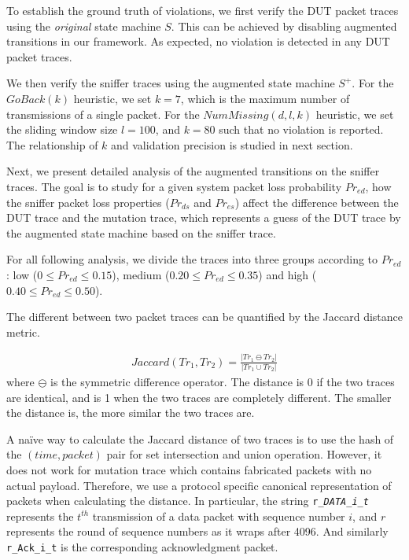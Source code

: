To establish the ground truth of violations, we first verify the DUT packet
traces using the \textit{original} state machine $S$.  This can be achieved by
disabling augmented transitions in our framework.  As expected, no violation is
detected in any DUT packet traces.

We then verify the sniffer traces using the augmented state machine $S^+$.  For
the $\mathit{GoBack}(k)$ heuristic, we set $k=7$, which is the maximum number of
transmissions of a single packet. For the $\mathit{NumMissing}(d, l, k)$ heuristic, we
set the sliding window size $l=100$, and $k=80$ such that no violation is
reported. The relationship of $k$ and validation precision is studied in next
section.

Next, we present detailed analysis of the augmented transitions on the sniffer
traces. The goal is to study for a given system packet loss probability
$Pr_{ed}$, how the sniffer packet loss properties ($Pr_{ds}$ and $Pr_{es}$)
affect the difference between the DUT trace and the mutation trace, which represents
a guess of the DUT trace by the augmented state machine based on the sniffer
trace.

For all following analysis, we divide the traces into three groups according to
$Pr_{ed}$: low ($0 \le Pr_{ed} \le 0.15$), medium ($0.20 \le Pr_{ed} \le 0.35$)
and high ($0.40 \le Pr_{ed} \le 0.50$).

The different between two packet traces can be quantified by the Jaccard distance
metric.

\begin{align}
  Jaccard(Tr_1, Tr_2) = \frac{\left\vert Tr_1 \ominus Tr_2\right\vert}{\left\vert
  Tr_1 \cup Tr_2\right\vert}
\end{align}%
where $\ominus$ is the symmetric difference operator.  The distance is 0 if the
two traces are identical, and is 1 when the two traces are completely different.
The smaller the distance is, the more similar the two traces are.

A na\"ive way to calculate the Jaccard distance of two traces is to use the hash
of the $(time, packet)$ pair for set intersection and union operation.  However,
it does not work for mutation trace which contains fabricated packets with no
actual payload.  Therefore, we use a protocol specific canonical representation
of packets when calculating the distance.  In particular, the string
\texttt{r\_\it{DATA}\_i\_t} represents the $t^{th}$ transmission of a data packet
with sequence number $i$, and $r$ represents the round of sequence numbers as it
wraps after 4096.  And similarly \texttt{r\_Ack\_i\_t} is the corresponding
acknowledgment packet.

